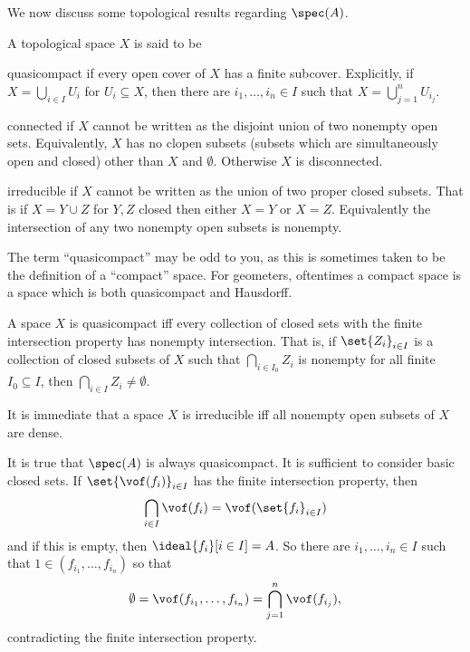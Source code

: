 We now discuss some topological results regarding $\spec(A)$.

\bdefn

    A topological space $X$ is said to be
    \benum
        \item {\emphcolor quasicompact} if every open cover of $X$ has a finite subcover.
        Explicitly, if $X=\bigcup_{i\in I}U_i$ for $U_i\subseteq X$, then there are $i_1,\dots,i_n\in I$ such that $X=\bigcup_{j=1}^nU_{i_j}$.
        \item {\emphcolor connected} if $X$ cannot be written as the disjoint union of two nonempty open sets.
        Equivalently, $X$ has no clopen subsets (subsets which are simultaneously open and closed) other than $X$ and $\emptyset$.
        Otherwise $X$ is {\emphcolor disconnected}.
        \item {\emphcolor irreducible} if $X$ cannot be written as the union of two proper closed subsets.
        That is if $X=Y\cup Z$ for $Y,Z$ closed then either $X=Y$ or $X=Z$.
        Equivalently the intersection of any two nonempty open subsets is nonempty.
    \eenum

\edefn

\bnote

    The term ``quasicompact'' may be odd to you, as this is sometimes taken to be the definition of a ``compact'' space.
    For geometers, oftentimes a compact space is a space which is both quasicompact and Hausdorff.

\enote

\bremark

    A space $X$ is quasicompact iff every collection of closed sets with the finite intersection property has nonempty intersection.
    That is, if $\set{Z_i}_{i\in I}$ is a collection of closed subsets of $X$ such that $\bigcap_{i\in I_0}Z_i$ is nonempty for all finite $I_0\subseteq I$, then $\bigcap_{i\in I}Z_i\neq\emptyset$.

\eremark

\bremark

    It is immediate that a space $X$ is irreducible iff all nonempty open subsets of $X$ are dense.

\eremark

It is true that $\spec(A)$ is always quasicompact.
It is sufficient to consider basic closed sets.
If $\set{\vof(f_i)}_{i\in I}$ has the finite intersection property, then
$$ \bigcap_{i\in I}\vof(f_i) = \vof(\set{f_i}_{i\in I}) $$
and if this is empty, then $\ideal{f_i}[i\in I]=A$.
So there are $i_1,\dots,i_n\in I$ such that $1\in(f_{i_1},\dots,f_{i_n})$ so that
$$ \emptyset = \vof(f_{i_1},\dots,f_{i_n}) = \bigcap_{j=1}^n\vof(f_{i_j}) , $$
contradicting the finite intersection property.

